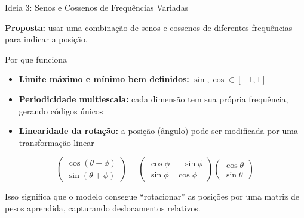\documentclass[aspectratio=169,xcolor=dvipsnames]{beamer}
\begin{document}
\begin{frame}{Ideia 3: Senos e Cossenos de Frequências Variadas}

\textbf{Proposta:} usar uma combinação de senos e cossenos de diferentes frequências para indicar a posição.

\vspace{2pt}

\begin{block}{Por que funciona}
\begin{itemize}
    \item \textbf{Limite máximo e mínimo bem definidos:} $\sin, \cos \in [-1, 1]$
    \item \textbf{Periodicidade multiescala:} cada dimensão tem sua própria frequência, gerando códigos únicos
    \item \textbf{Linearidade da rotação:} a posição (ângulo) pode ser modificada por uma transformação linear
\end{itemize}
\end{block}

\vspace{2pt}

\[
\begin{pmatrix} \cos(\theta + \phi) \\ \sin(\theta + \phi) \end{pmatrix}
=
\begin{pmatrix} \cos\phi & -\sin\phi \\ \sin\phi & \cos\phi \end{pmatrix}
\begin{pmatrix} \cos\theta \\ \sin\theta \end{pmatrix}
\]

\vspace{2pt}

Isso significa que o modelo consegue ``rotacionar'' as posições por uma matriz de pesos aprendida, capturando deslocamentos relativos.

\end{frame}

\end{document}
